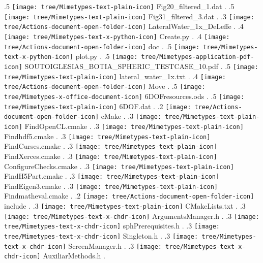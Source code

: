 {.5 { \texttt{[image: tree/Mimetypes-text-plain-icon]} Fig20\_filtered\_1.dat }.
.5 { \texttt{[image: tree/Mimetypes-text-plain-icon]} Fig31\_filtered\_3.dat }.
.3 { \texttt{[image: tree/Actions-document-open-folder-icon]} LateralWater\_1x\_DeLeffe }.
.4 { \texttt{[image: tree/Mimetypes-text-x-python-icon]} Create.py }.
.4 { \texttt{[image: tree/Actions-document-open-folder-icon]} doc }.
.5 { \texttt{[image: tree/Mimetypes-text-x-python-icon]} plot.py }.
.5 { \texttt{[image: tree/Mimetypes-application-pdf-icon]} SOUTOIGLESIAS\_BOTIA\_SPHERIC\_TESTCASE\_10.pdf }.
.5 { \texttt{[image: tree/Mimetypes-text-plain-icon]} lateral\_water\_1x.txt }.
.4 { \texttt{[image: tree/Actions-document-open-folder-icon]} Move }.
.5 { \texttt{[image: tree/Mimetypes-x-office-document-icon]} 6DOFresources.ods }.
.5 { \texttt{[image: tree/Mimetypes-text-plain-icon]} 6DOF.dat }.
.2 { \texttt{[image: tree/Actions-document-open-folder-icon]} cMake }.
.3 { \texttt{[image: tree/Mimetypes-text-plain-icon]} FindOpenCL.cmake }.
.3 { \texttt{[image: tree/Mimetypes-text-plain-icon]} Findhdf5.cmake }.
.3 { \texttt{[image: tree/Mimetypes-text-plain-icon]} FindCurses.cmake }.
.3 { \texttt{[image: tree/Mimetypes-text-plain-icon]} FindXerces.cmake }.
.3 { \texttt{[image: tree/Mimetypes-text-plain-icon]} ConfigureChecks.cmake }.
.3 { \texttt{[image: tree/Mimetypes-text-plain-icon]} FindH5Part.cmake }.
.3 { \texttt{[image: tree/Mimetypes-text-plain-icon]} FindEigen3.cmake }.
.3 { \texttt{[image: tree/Mimetypes-text-plain-icon]} Findmatheval.cmake }.
.2 { \texttt{[image: tree/Actions-document-open-folder-icon]} include }.
.3 { \texttt{[image: tree/Mimetypes-text-plain-icon]} CMakeLists.txt }.
.3 { \texttt{[image: tree/Mimetypes-text-x-chdr-icon]} ArgumentsManager.h }.
.3 { \texttt{[image: tree/Mimetypes-text-x-chdr-icon]} sphPrerequisites.h }.
.3 { \texttt{[image: tree/Mimetypes-text-x-chdr-icon]} Singleton.h }.
.3 { \texttt{[image: tree/Mimetypes-text-x-chdr-icon]} ScreenManager.h }.
.3 { \texttt{[image: tree/Mimetypes-text-x-chdr-icon]} AuxiliarMethods.h }.
}
